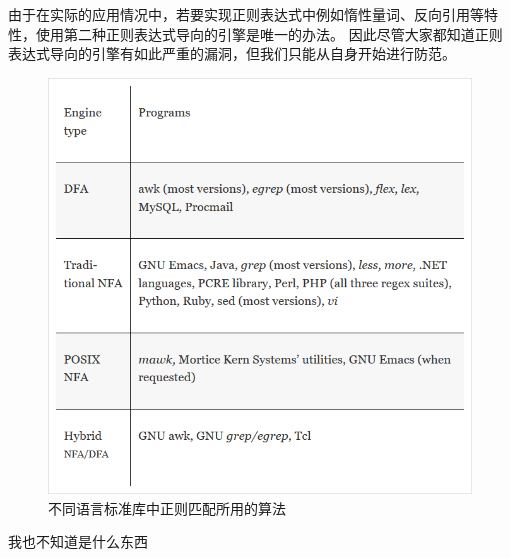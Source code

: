 \documentclass[hyperref,UTF8,12pt,a4paper]{ctexart}
\begin{document}
由于在实际的应用情况中，若要实现正则表达式中例如惰性量词、反向引用等特性，使用第二种正则表达式导向的引擎是唯一的办法。
因此尽管大家都知道正则表达式导向的引擎有如此严重的漏洞，但我们只能从自身开始进行防范。

\begin{figure}[h]
	\centering
	\includegraphics[width=15cm]{figures/languages.png}
	\caption{不同语言标准库中正则匹配所用的算法}
\end{figure}

\newpage



\begin{thebibliography}{99}
 我也不知道是什么东西

\end {thebibliography}
\end{document}
